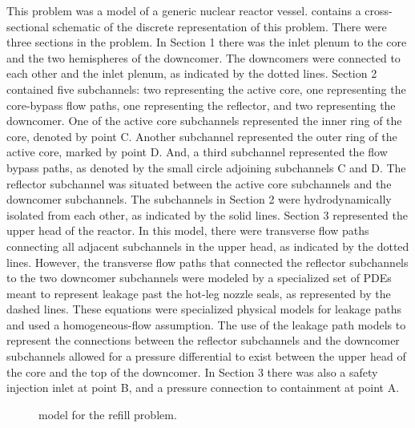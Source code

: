 This problem was a model of a generic nuclear reactor vessel.
 contains a cross-sectional schematic of the discrete representation of this problem.
There were three sections in the problem.
In Section 1 there was the inlet plenum to the core and the two hemispheres of the downcomer.
The downcomers were connected to each other and the inlet plenum, as indicated by the dotted lines.
Section 2 contained five subchannels: two representing the active core, one representing the core-bypass flow paths, one representing the reflector, and two representing the downcomer.
One of the active core subchannels represented the inner ring of the core, denoted by point C.
Another subchannel represented the outer ring of the active core, marked by point D.
And, a third subchannel represented the flow bypass paths, as denoted by the small circle adjoining subchannels C and D.
The reflector subchannel was situated between the active core subchannels and the downcomer subchannels.
The subchannels in Section 2 were hydrodynamically isolated from each other, as indicated by the solid lines.
Section 3 represented the upper head of the reactor.
In this model, there were transverse flow paths connecting all adjacent subchannels in the upper head, as indicated by the dotted lines.
However, the transverse flow paths that connected the reflector subchannels to the two downcomer subchannels were modeled by a specialized set of PDEs meant to represent leakage past the hot-leg nozzle seals, as represented by the dashed lines.
These equations were specialized physical models for leakage paths and used a homogeneous-flow assumption.
The use of the leakage path models to represent the connections between the reflector subchannels and the downcomer subchannels allowed for a pressure differential to exist between the upper head of the core and the top of the downcomer.
In Section 3 there was also a safety injection inlet at point B, and a pressure connection to containment at point A.

\begin{figure}[h!tb]
\centering

\caption{\cobra{} model for the refill problem.}
\label{fig:refillModel}
\end{figure}

